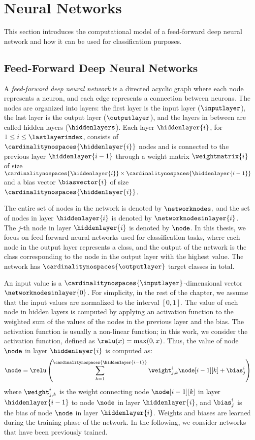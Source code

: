\section{Neural Networks}

This section introduces the computational model of a feed-forward deep neural network and how it can be used for classification purposes.
\subsection{Feed-Forward Deep Neural Networks}

A \emph{feed-forward deep neural network} is a directed acyclic graph where each node represents a neuron, and each edge represents a connection between neurons. The nodes are organized into layers: the first layer is the input layer ($\inputlayer$), the last layer is the output layer ($\outputlayer$), and the layers in between are called hidden layers ($\hiddenlayers$). Each layer $\hiddenlayer{i}$, for $1 \le i \le \lastlayerindex$, consists of $\cardinalitynospaces{\hiddenlayer{i}}$ nodes and is connected to the previous layer $\hiddenlayer{i-1}$ through a weight matrix $\weightmatrix{i}$ of size $\cardinalitynospaces{\hiddenlayer{i}}\times\cardinalitynospaces{\hiddenlayer{i-1}}$ and a bias vector $\biasvector{i}$ of size $\cardinalitynospaces{\hiddenlayer{i}}$.

The entire set of nodes in the network is denoted by $\networknodes$, and the set of nodes in layer $\hiddenlayer{i}$ is denoted by $\networknodesinlayer{i}$. The $j$-th node in layer $\hiddenlayer{i}$ is denoted by $\node$. In this thesis, we focus on feed-forward neural networks used for classification tasks, where each node in the output layer represents a class, and the output of the network is the class corresponding to the node in the output layer with the highest value. The network has $\cardinalitynospaces{\outputlayer}$ target classes in total.

An input value is a $\cardinalitynospaces{\inputlayer}$-dimensional vector $\networknodesinlayer{0}$. For simplicity, in the rest of the chapter, we assume that the input values are normalized to the interval $[0,1]$. The value of each node in hidden layers is computed by applying an activation function to the weighted sum of the values of the nodes in the previous layer and the bias. The activation function is usually a non-linear function; in this work, we consider the \relu{} activation function, defined as $\relu(x) = \max(0, x)$. Thus, the value of node $\node$ in layer $\hiddenlayer{i}$ is computed as:
\begin{align*}
\node = \relu\left(
\sum_{k=1}^{\cardinalitynospaces{\hiddenlayer{i-1}}} \weight_{j,k}^{i} \node[i-1][k] + \bias_{j}^{i}
\right)
\end{align*}
where $\weight_{j,k}^{i}$ is the weight connecting node $\node[i-1][k]$ in layer $\hiddenlayer{i-1}$ to node $\node$ in layer $\hiddenlayer{i}$, and $\bias_{j}^{i}$ is the bias of node $\node$ in layer $\hiddenlayer{i}$. Weights and biases are learned during the training phase of the network. In the following, we consider networks that have been previously trained.

